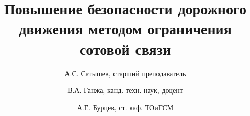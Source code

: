 \newcommand{\mainAuthor}{А.С. Сатышев}
\newcommand{\articleTitle}{Повышение безопасности дорожного движения методом ограничения сотовой связи}
\newcommand{\keywords}{безопасность дорожного движения, базовые станции сотовой связи, транспортные средства, GSM jammer}
\newcommand{\udk}{608.2}

\author{\mainAuthor, старший преподаватель}
\author{В.А. Ганжа, канд. техн. наук, доцент}
\author{А.Е. Бурцев, ст. каф. ТОиГСМ}

\title{\articleTitle}
\date{}
